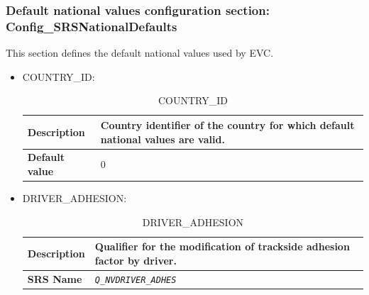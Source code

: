 \documentclass{template/openetcs}
\begin{document}
\subsubsection{Default national values configuration section: Config\_SRSNationalDefaults}
	This section defines the default national values used by EVC.
	
	\begin{itemize}
		\item COUNTRY\_ID:
		
			\begin{longtable}{|l|l|}
				\caption{COUNTRY\_ID}\\ 
				\hline
				
					\begin{minipage}[t]{0.22\linewidth} \textbf{Description}	\end{minipage} 
				&	\begin{minipage}[t]{0.78\linewidth} Country identifier of the country for which default national values are valid. \end{minipage} \\
				
				\hline
				
					\begin{minipage}[t]{0.22\linewidth} \textbf{Default value}	\end{minipage} 
				&	\begin{minipage}[t]{0.78\linewidth} 0 \end{minipage} \\
				
				\hline
				
			\end{longtable}
			
		\item DRIVER\_ADHESION:
		
			\begin{longtable}{|l|l|}
				\caption{DRIVER\_ADHESION}\\ 	
				\hline
				
					\begin{minipage}[t]{0.22\linewidth} \textbf{Description}	\end{minipage} 
				&	\begin{minipage}[t]{0.78\linewidth} Qualifier for the modification of trackside adhesion factor by driver. \end{minipage} \\
				
				\hline
				
					\begin{minipage}[t]{0.22\linewidth} \textbf{SRS Name}	\end{minipage} 
				&	\begin{minipage}[t]{0.78\linewidth} \emph{\texttt{Q\_NVDRIVER\_ADHES}} \end{minipage} \\
				

\end{longtable}
\end{itemize}
\end{document}
